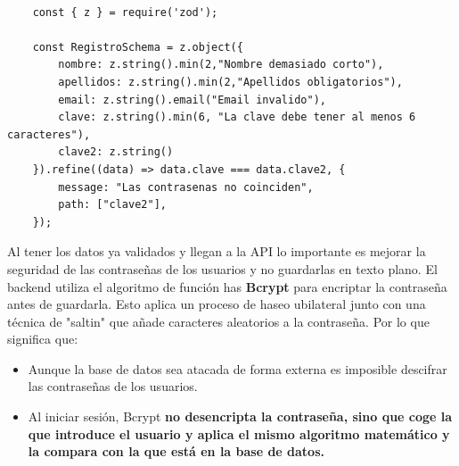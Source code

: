 \documentclass[a4paper,11pt]{article}
\begin{document}
\begin{lstlisting}[style=javascript, caption={Ejemplo de validación de datos al registrarse un nuevo usuario.}]

    const { z } = require('zod');

    const RegistroSchema = z.object({
        nombre: z.string().min(2,"Nombre demasiado corto"),
        apellidos: z.string().min(2,"Apellidos obligatorios"),
        email: z.string().email("Email invalido"),
        clave: z.string().min(6, "La clave debe tener al menos 6 caracteres"),
        clave2: z.string()
    }).refine((data) => data.clave === data.clave2, {
        message: "Las contrasenas no coinciden",
        path: ["clave2"],
    });

\end{lstlisting}

Al tener los datos ya validados y llegan a la API lo importante es mejorar la seguridad de las contraseñas de los usuarios y no guardarlas en texto plano. El backend utiliza el algoritmo de función has \textbf{Bcrypt} para encriptar la contraseña antes de guardarla. Esto aplica un proceso de haseo ubilateral junto con una técnica de "saltin" que añade caracteres aleatorios a la contraseña. Por lo que significa que:

\begin{itemize}
    \item Aunque la base de datos sea atacada de forma externa es imposible descifrar las contraseñas de los usuarios.
    \item Al iniciar sesión, Bcrypt \textbf{no desencripta la contraseña, sino que coge la que introduce el usuario y aplica el mismo algoritmo matemático y la compara con la que está en la base de datos.} \cite{8}
\end{itemize}

\vspace{0.5cm}
\end{document}
